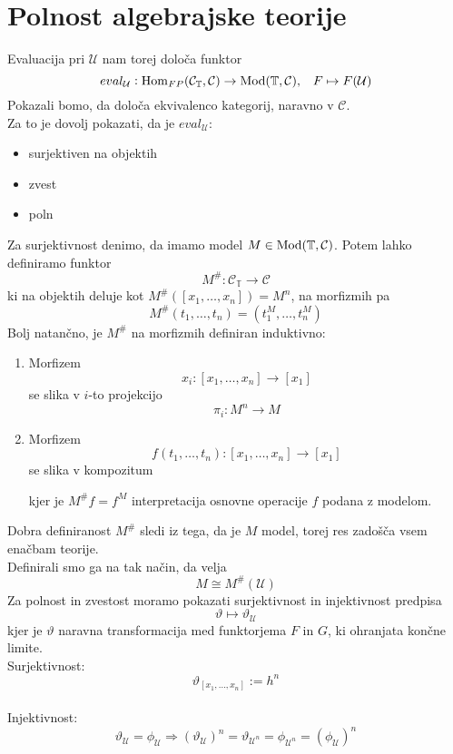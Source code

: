 \documentclass[../kategoricna_logika.tex]{subfiles}
\begin{document}
\section{Polnost algebrajske teorije}
%
Evaluacija pri $\mathcal{U}$ nam torej določa funktor
$$eval_\mathcal{U} : \operatorname{Hom}_{FP}(\mathcal{C}_\mathbb{T}, \mathcal{C}) \to \operatorname{Mod}(\mathbb{T}, \mathcal{C}) \text{,} \quad F \mapsto F(\mathcal{U})$$
%
Pokazali bomo, da določa ekvivalenco kategorij, naravno v $\mathcal{C}$.\\
Za to je dovolj pokazati, da je $eval_\mathcal{U}$:
\begin{itemize}
\item surjektiven na objektih
\item zvest
\item poln
\end{itemize}
Za surjektivnost denimo, da imamo model $M \in \operatorname{Mod}(\mathbb{T}, \mathcal{C})$. Potem lahko definiramo funktor 
$$M^{\#} : \mathcal{C}_\mathbb{T} \to \mathcal{C}$$
ki na objektih deluje kot $M^{\#}([x_1, \ldots, x_n]) = M^n$, na morfizmih pa
$$M^{\#}(t_1, \ldots, t_n) = (t_1^M, \ldots, t_n^M)$$
%
%
Bolj natančno, je $M^{\#}$ na morfizmih definiran induktivno:
\begin{enumerate}
\item Morfizem $$x_i : [x_1, \ldots, x_n] \to [x_1]$$ se slika v $i$-to projekcijo $$\pi_i : M^n \to M$$
\item Morfizem $$f(t_1, \ldots, t_n) : [x_1, \ldots, x_n] \to [x_1]$$ se slika v kompozitum
\begin{center}
\end{center}
kjer je $M^{\#}f = f^M$ interpretacija osnovne operacije $f$ podana z modelom.
\end{enumerate}
%
Dobra definiranost $M^{\#}$ sledi iz tega, da je $M$ model, torej res zadošča vsem enačbam teorije.\\
Definirali smo ga na tak način, da velja
$$M \cong M^{\#}(\mathcal{U})$$
%
Za polnost in zvestost moramo pokazati surjektivnost in injektivnost predpisa $$\vartheta \mapsto \vartheta_\mathcal{U}$$
kjer je $\vartheta$ naravna transformacija med funktorjema $F$ in $G$, ki ohranjata končne limite.\\
Surjektivnost: $$\vartheta_{[x_1, \ldots, x_n]} := h^n$$\\
Injektivnost: $$\vartheta_\mathcal{U} = \phi_\mathcal{U} \Rightarrow (\vartheta_\mathcal{U})^n = \vartheta_{\mathcal{U}^n} = \phi_{\mathcal{U}^n} = (\phi_\mathcal{U})^n$$
\end{document}
